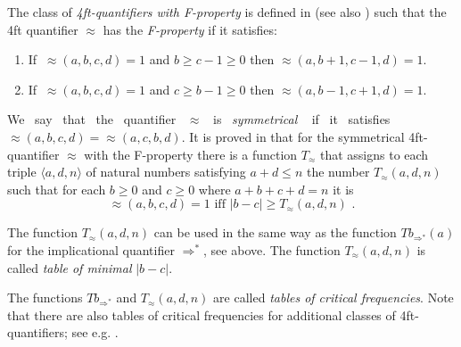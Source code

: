The class of {\em 4ft-quantifiers with F-property} is defined in \cite{Ra:86} (see  also 
\cite{Ra:07}) such that 
the 4ft quantifier $\approx$ has the {\em F-property} if it satisfies:
\begin{enumerate}
\item If $ \  \approx(a,b,c,d) = 1 $ and $ b \geq c-1 \geq 0 $
then $ \approx(a,b+1,c-1,d) = 1 $.

\item If $ \ \approx(a,b,c,d) = 1 $ and $ c \geq b -1 \geq 0 $
then $ \approx(a,b-1,c+1,d) = 1 $.
\end{enumerate}

We \ say \ that \ the \ quantifier \ $\approx$ \ is \ {\em symmetrical} \ \cite{Ha:78}
if \ it \ satisfies \mbox{$\approx(a,b,c,d) = \approx(a,c,b,d)$}. 
It is proved in \cite{Ra:86} that for the symmetrical 4ft-quantifier $\approx$ with the 
F-property there is a function $T_{\approx}$ that assigns to each triple $\langle a,d,n \rangle$ of natural numbers satisfying 
$a+d \leq n $ the number $T_{\approx}(a,d,n)$ such that for each $b \geq 0$ and $c \geq 0$ where 
$a+b+c+d = n $ it is 
%
$$ \approx(a,b,c,d) = 1 \mbox{ iff } |b-c| \geq T_{\approx}(a,d,n) \mbox{ .}$$

The function $T_{\approx}(a,d,n)$ can be used in the same way as the function 
$ Tb_{\Rightarrow^{*}}(a) $ for the implicational quantifier 
$ \Rightarrow^{*}$,  see above. 
The function $T_{\approx}(a,d,n)$ is called {\em table of minimal} 
$|b-c|$. 

The  functions $Tb_{\Rightarrow^{*}}$ and $T_{\approx}(a,d,n)$ are called 
{\em tables of critical frequencies}. Note that there are also tables of critical frequencies 
for additional classes  of 4ft-quantifiers; see e.g. \cite{Ra:07}. 
